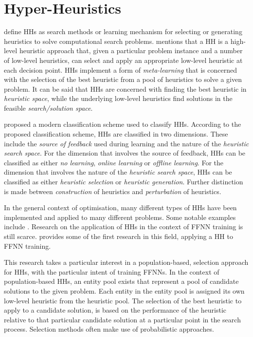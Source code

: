 \section{Hyper-Heuristics}
\label{sec:hhs}

\citeauthor{ref:burke:2010} \cite{ref:burke:2010} define \acp{HH} as search methods or learning mechanism for selecting or generating heuristics to solve computational search problems. \citeauthor{ref:burke:2003} \cite{ref:burke:2003} mentions that a \acs{HH} is a high-level heuristic approach that, given a particular problem instance and a number of low-level heuristics, can select and apply an appropriate low-level heuristic at each decision point. \acp{HH} implement a form of \textit{meta-learning} that is concerned with the selection of the best heuristic from a pool of heuristics to solve a given problem. It can be said that \acp{HH} are concerned with finding the best heuristic in \textit{heuristic space}, while the underlying low-level heuristics find solutions in the feasible \textit{search/solution space}.

\citeauthor{ref:burke:2010} \cite{ref:burke:2010} proposed a modern classification scheme used to classify \acp{HH}. According to the proposed classification scheme, \acp{HH} are classified in two dimensions. These include the \textit{source of feedback} used during learning and the nature of the \textit{heuristic search space}. For the dimension that involves the source of feedback, \acp{HH} can be classified as either \textit{no learning}, \textit{online learning} or \textit{offline learning}. For the dimension that involves the nature of the \textit{heuristic search space}, \acp{HH} can be classified as either \textit{heuristic selection} or \textit{heuristic generation}. Further distinction is made between \textit{construction} of heuristics and \textit{perturbation} of heuristics.

In the general context of optimisation, many different types of \acp{HH} have been implemented and applied to many different problems. Some notable examples include \cite{ref:dowsland:2007, ref:burke:2010, ref:grobler:2012, ref:vanderstockt:2018}. Research on the application of \acp{HH} in the context of \acs{FFNN} training is still scarce. \citeauthor{ref:nel:2021} \cite{ref:nel:2021} provides some of the first research in this field, applying a \acs{HH} to \acs{FFNN} training.

This research takes a particular interest in a population-based, selection approach for \acp{HH}, with the particular intent of training \acp{FFNN}. In the context of population-based \acp{HH}, an entity pool exists that represent a pool of candidate solutions to the given problem. Each entity in the entity pool is assigned its own low-level heuristic from the heuristic pool. The selection of the best heuristic to apply to a candidate solution, is based on the performance of the heuristic relative to that particular candidate solution at a particular point in the search process. Selection methods often make use of probabilistic approaches.